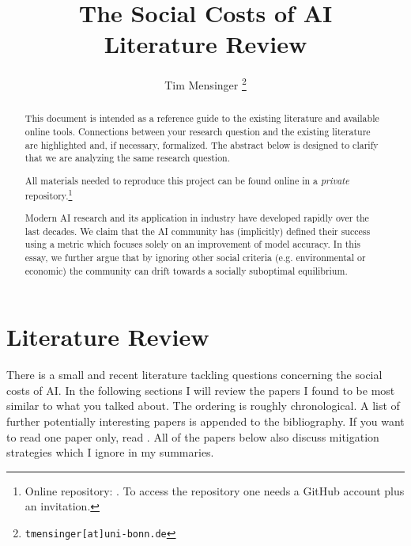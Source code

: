 \documentclass[a4paper, 12pt]{article}
\title{\textbf{The Social Costs of AI}\\
    \Large Literature Review
}
\date{}
\author{Tim Mensinger%
  \thanks{\texttt{tmensinger[at]uni-bonn.de}}
}
\affil{Bonn Graduate School of Economics}
\begin{document}
\onehalfspacing


\maketitle

\renewcommand{\abstractname}{Preamble}
\begin{abstract}
    \noindent This document is intended as a reference guide to the existing literature
    and available online tools. Connections between your research question and the
    existing literature are highlighted and, if necessary, formalized. The abstract
    below is designed to clarify that we are analyzing the same research question.

    All materials needed to reproduce this project can be found online in a
    \emph{private} repository.\footnote{Online repository:
    . To access the repository one
    needs a GitHub account plus an invitation.}
\end{abstract}

\renewcommand{\abstractname}{Abstract}
\begin{abstract}
    \noindent Modern AI research and its application in industry have developed rapidly
    over the last decades. We claim that the AI community has (implicitly) defined their
    success using a metric which focuses solely on an improvement of model accuracy. In
    this essay, we further argue that by ignoring other social criteria (e.g.
    environmental or economic) the community can drift towards a socially suboptimal
    equilibrium.
\end{abstract}
\thispagestyle{empty}

\newpage



\section{Literature Review}

There is a small and recent literature tackling questions concerning the social costs of
AI. In the following sections I will review the papers I found to be most similar to
what you talked about. The ordering is roughly chronological. A list of further
potentially interesting papers is appended to the bibliography. If you want to read one
paper only, read . All of the papers below also discuss
mitigation strategies which I ignore in my summaries.
\end{document}
